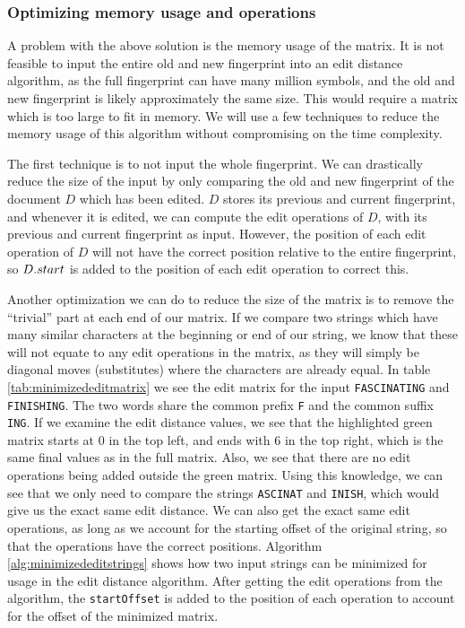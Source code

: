 \subsubsection{Optimizing memory usage and operations}

A problem with the above solution is the memory usage of the matrix. It is not feasible to
input the entire old and new fingerprint into an edit distance algorithm, as the full
fingerprint can have many million symbols, and the old and new fingerprint is likely
approximately the same size. This would require a matrix which is too large to fit in
memory. We will use a few techniques to reduce the memory usage of this algorithm without
compromising on the time complexity.

The first technique is to not input the whole fingerprint. We can drastically reduce the
size of the input by only comparing the old and new fingerprint of the document $D$ which
has been edited. $D$ stores its previous and current fingerprint, and whenever it is
edited, we can compute the edit operations of $D$, with its previous and current
fingerprint as input. However, the position of each edit operation of $D$ will not have
the correct position relative to the entire fingerprint, so ${{D}.{start}}$ is
added to the position of each edit operation to correct this.

Another optimization we can do to reduce the size of the matrix is to remove the
``trivial'' part at each end of our matrix. If we compare two strings which have many
similar characters at the beginning or end of our string, we know that these will not
equate to any edit operations in the matrix, as they will simply be diagonal moves
(substitutes) where the characters are already equal. In table
\ref{tab:minimizededitmatrix} we see the edit matrix for the input \verb|FASCINATING| and
\verb|FINISHING|. The two words share the common prefix \verb|F| and the common suffix
\verb|ING|. If we examine the edit distance values, we see that the highlighted green
matrix starts at $0$ in the top left, and ends with $6$ in the top right, which is the
same final values as in the full matrix. Also, we see that there are no edit operations
being added outside the green matrix. Using this knowledge, we can see that we only need
to compare the strings \verb|ASCINAT| and \verb|INISH|, which would give us the exact same
edit distance. We can also get the exact same edit operations, as long as we account for
the starting offset of the original string, so that the operations have the correct
positions. Algorithm \ref{alg:minimizededitstrings} shows how two input strings can be
minimized for usage in the edit distance algorithm. After getting the edit operations from
the algorithm, the \verb|startOffset| is added to the position of each operation to
account for the offset of the minimized matrix.

